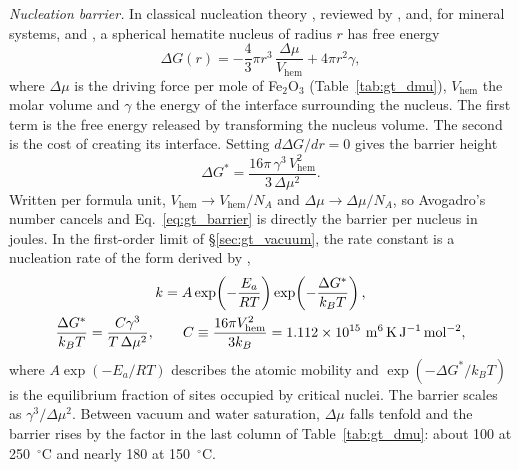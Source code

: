 \textit{Nucleation barrier.} In classical nucleation theory \citep{gibbs1878,volmer1926,becker1935},
reviewed by \citet{christian2002}, \citet{kashchiev2000} and, for mineral systems,
\citet{deyoreo2003} and \citet{lasaga1998}, a spherical hematite nucleus of radius $r$ has free
energy
\begin{equation}
  \Delta G(r) = -\frac{4}{3}\pi r^{3}\,\frac{\Delta\mu}{V_{\mathrm{hem}}} + 4\pi r^{2}\gamma,
\end{equation}
where $\Delta\mu$ is the driving force per mole of Fe$_2$O$_3$ (Table~\ref{tab:gt_dmu}),
$V_{\mathrm{hem}}$ the molar volume and $\gamma$ the energy of the interface surrounding the
nucleus. The first term is the free energy released by transforming the nucleus volume. The second
is the cost of creating its interface. Setting $d\Delta G/dr=0$ gives the barrier height
\begin{equation}
  \Delta G^{*} = \frac{16\pi\,\gamma^{3}\,V_{\mathrm{hem}}^{2}}{3\,\Delta\mu^{2}} .
  \label{eq:gt_barrier}
\end{equation}
Written per formula unit, $V_{\mathrm{hem}}\to V_{\mathrm{hem}}/N_A$ and $\Delta\mu\to\Delta\mu/N_A$, so
Avogadro's number cancels and Eq.~\eqref{eq:gt_barrier} is directly the barrier per nucleus in
joules. In the first-order limit of \S\ref{sec:gt_vacuum}, the rate constant is a nucleation
rate of the form derived by \citet{turnbull1949},
\begin{gather}
  k = A\exp\!\left(-\frac{E_a}{RT}\right)\exp\!\left(-\frac{\Delta G^{*}}{k_B T}\right), \notag\\
  \frac{\Delta G^{*}}{k_B T} = \frac{C\gamma^{3}}{T\,\Delta\mu^{2}},
  \qquad
  C \equiv \frac{16\pi V_{\mathrm{hem}}^{2}}{3k_B} = 1.112\times10^{15}~\mathrm{m^6\,K\,J^{-1}\,mol^{-2}} ,
  \label{eq:gt_knuc}
\end{gather}
where $A\exp(-E_a/RT)$ describes the atomic mobility and $\exp(-\Delta G^{*}/k_BT)$ is the
equilibrium fraction of sites occupied by critical nuclei. The barrier scales as $\gamma^3/\Delta\mu^2$. Between vacuum and water
saturation, $\Delta\mu$ falls tenfold and the barrier rises by the factor in the last column of
Table~\ref{tab:gt_dmu}: about 100 at 250~$^\circ$C and nearly 180 at 150~$^\circ$C.

